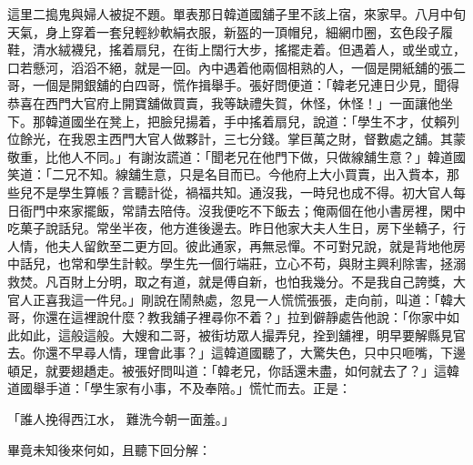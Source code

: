 \begin{showcontents}{}
這里二搗鬼與婦人被捉不題。單表那日韓道國舖子里不該上宿，來家早。八月中旬天氣，身上穿着一套兒輕紗軟絹衣服，新盔的一頂帽兒，細網巾圈，玄色段子履鞋，清水絨襪兒，搖着扇兒，在街上闊行大步，搖擺走着。但遇着人，或坐或立，口若懸河，滔滔不絕，就是一回。內中遇着他兩個相熟的人，一個是開紙舖的張二哥，一個是開銀舖的白四哥，慌作揖舉手。張好問便道：「韓老兄連日少見，聞得恭喜在西門大官府上開寶舖做買賣，我等缺禮失賀，休怪，休怪！」一面讓他坐下。那韓道國坐在凳上，把臉兒揚着，手中搖着扇兒，說道：「學生不才，仗賴列位餘光，在我恩主西門大官人做夥計，三七分錢。掌巨萬之財，督數處之舖。其蒙敬重，比他人不同。」有謝汝謊道：「聞老兄在他門下做，只做線舖生意？」韓道國笑道：「二兄不知。線舖生意，只是名目而已。今他府上大小買賣，出入貲本，那些兒不是學生算帳？言聽計從，禍福共知。通沒我，一時兒也成不得。初大官人每日衙門中來家擺飯，常請去陪侍。沒我便吃不下飯去；俺兩個在他小書房裡，閑中吃菓子說話兒。常坐半夜，他方進後邊去。昨日他家大夫人生日，房下坐轎子，行人情，他夫人留飲至二更方回。彼此通家，再無忌憚。不可對兄說，就是背地他房中話兒，也常和學生計較。學生先一個行端莊，立心不苟，與財主興利除害，拯溺救焚。凡百財上分明，取之有道，就是傅自新，也怕我幾分。不是我自己誇獎，大官人正喜我這一件兒。」剛說在鬧熱處，忽見一人慌慌張張，走向前，叫道：「韓大哥，你還在這裡說什麼？教我舖子裡尋你不着？」拉到僻靜處告他說：「你家中如此如此，這般這般。大嫂和二哥，被街坊眾人撮弄兒，拴到舖裡，明早要解縣見官去。你還不早尋人情，理會此事？」這韓道國聽了，大驚失色，只中只咂嘴，下邊頓足，就要翅趫走。被張好問叫道：「韓老兄，你話還未盡，如何就去了？」這韓道國舉手道：「學生家有小事，不及奉陪。」慌忙而去。正是：

「誰人挽得西江水，  難洗今朝一面羞。」

畢竟未知後來何如，且聽下回分解：






\end{showcontents}



